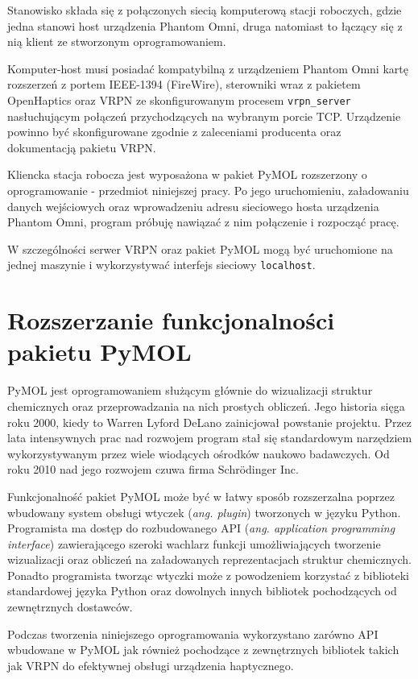 \documentclass[licencjacka]{pracamgr}
\begin{document}
Stanowisko składa się z połączonych siecią komputerową stacji roboczych, gdzie jedna stanowi host urządzenia Phantom Omni, druga natomiast to łączący się z nią klient ze stworzonym oprogramowaniem. 

Komputer-host musi posiadać kompatybilną z urządzeniem Phantom Omni kartę rozszerzeń z portem IEEE-1394 (FireWire), sterowniki wraz z pakietem OpenHaptics oraz VRPN ze skonfigurowanym procesem \texttt{vrpn\_server} nasłuchującym połączeń przychodzących na wybranym porcie TCP. Urządzenie powinno być skonfigurowane zgodnie z zaleceniami producenta oraz dokumentacją pakietu VRPN.

Kliencka stacja robocza jest wyposażona w pakiet PyMOL rozszerzony o oprogramowanie - przedmiot niniejszej pracy. Po jego uruchomieniu, załadowaniu danych wejściowych oraz wprowadzeniu adresu sieciowego hosta urządzenia Phantom Omni, program próbuję nawiązać z nim połączenie i rozpocząć pracę.

W szczególności serwer VRPN oraz pakiet PyMOL mogą być uruchomione na jednej maszynie i wykorzystywać interfejs sieciowy \texttt{localhost}.

\section{Rozszerzanie funkcjonalności pakietu PyMOL}

PyMOL jest oprogramowaniem służącym głównie do wizualizacji struktur chemicznych oraz przeprowadzania na nich prostych obliczeń. Jego historia sięga roku 2000, kiedy to Warren Lyford DeLano zainicjował powstanie projektu. Przez lata intensywnych prac nad rozwojem program stał się standardowym narzędziem wykorzystywanym przez wiele wiodących ośrodków naukowo badawczych. Od roku 2010 nad jego rozwojem czuwa firma Schrödinger Inc.

Funkcjonalność pakiet PyMOL może być w łatwy sposób rozszerzalna poprzez wbudowany system obsługi wtyczek (\textit{ang. plugin}) tworzonych w języku Python. Programista ma dostęp do rozbudowanego API (\textit{ang. application programming interface}) zawierającego szeroki wachlarz funkcji umożliwiających tworzenie wizualizacji oraz obliczeń na załadowanych reprezentacjach struktur chemicznych. Ponadto programista tworząc wtyczki może z powodzeniem korzystać z biblioteki standardowej języka Python oraz dowolnych innych bibliotek pochodzących od zewnętrznych dostawców.

Podczas tworzenia niniejszego oprogramowania wykorzystano zarówno API wbudowane w PyMOL jak również pochodzące z zewnętrznych bibliotek takich jak VRPN do efektywnej obsługi urządzenia haptycznego.
\end{document}
